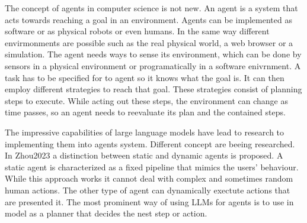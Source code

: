 \documentclass[../../main.tex]{subfiles}
\begin{document}
The concept of agents in computer science is not new. An agent is a system that 
acts towards reaching a goal in an environment. Agents can be implemented as software or as physical robots or even humans. In the same way different envirmonments are possible such as the real physical world, a web browser or a simulation. The agent needs ways to sense its environment, which can be done by sensors in a physical environment or programatically in a software enivrnment. A task has to be specified for to agent so it knows what the goal is. It can then employ different strategies to reach that goal. These strategies consist of planning steps to execute. While acting out these steps, the environment can change as time passes, so an agent needs to reevaluate its plan and the contained steps.

The impressive capabilities of large language models have lead to research to implementing them into agents system. Different concept are beeing researched. In Zhou2023 a distinction between static and dynamic agents is proposed. A static agent is characterized as a fixed pipeline that mimics the users' behaviour. While this approach works it cannot deal with complex and sometimes random human actions. The other type of agent can dynamically exectute actions that are presented it. 
The most prominent way of using LLMs for agents is to use in model as a planner that decides the nest step or action.
\end{document}
